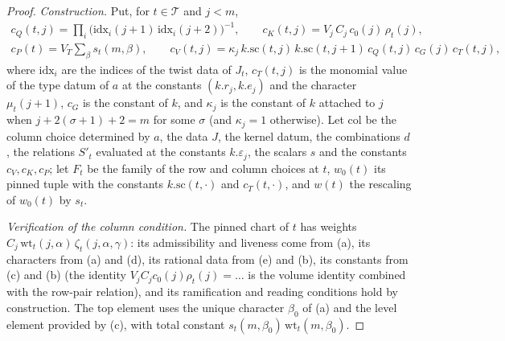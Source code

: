 \begin{proof}
\emph{Construction.} Put, for $t\in\mathcal T$ and $j<m$,
\begin{gather*}
c_Q(t,j)=\prod_i\bigl(\mathrm{idx}_i(j+1)\,\mathrm{idx}_i(j+2)\bigr)^{-1},\qquad
c_K(t,j)=V_j\,C_j\,c_0(j)\,\rho_t(j),\\
c_P(t)=V_T\sum_\beta s_t(m,\beta),\qquad
c_V(t,j)=\kappa_j\,k.\mathrm{sc}(t,j)\,k.\mathrm{sc}(t,j+1)\,c_Q(t,j)\,c_G(j)\,c_T(t,j),
\end{gather*}
where $\mathrm{idx}_i$ are the indices of the twist data of $J_t$, $c_T(t,j)$ is the monomial value of the type datum of $a$
at the constants $(k.r_j,k.e_j)$ and the character $\mu_t(j+1)$, $c_G$ is the constant of $k$, and $\kappa_j$ is the
constant of $k$ attached to $j$ when $j+2(\sigma+1)+2=m$ for some $\sigma$ (and $\kappa_j=1$ otherwise). Let $\mathrm{col}$ be
the column choice determined by $a$, the data $J$, the kernel datum, the combinations $d$, the relations $S'_t$ evaluated
at the constants $k.\varepsilon_j$, the scalars $s$ and the constants $c_V,c_K,c_P$; let $F_t$ be the family of the row
and column choices at $t$, $w_0(t)$ its pinned tuple with the constants $k.\mathrm{sc}(t,\cdot)$ and $c_T(t,\cdot)$, and
$w(t)$ the rescaling of $w_0(t)$ by $s_t$.

\emph{Verification of the column condition.} The pinned chart of $t$ has weights $C_j\,\mathrm{wt}_t(j,\alpha)\,\zeta_t(j,
\alpha,\gamma)$: its admissibility and liveness come from (a), its characters from (a) and (d), its rational data from (e)
and (b), its constants from (c) and (b) (the identity $V_jC_jc_0(j)\rho_t(j)=\dots$ is the volume identity combined with
the row-pair relation), and its ramification and reading conditions hold by construction. The top element uses the unique
character $\beta_0$ of (a) and the level element provided by (c), with total constant $s_t(m,\beta_0)\,\mathrm{wt}_t(m,\beta_0)$.


\end{proof}
